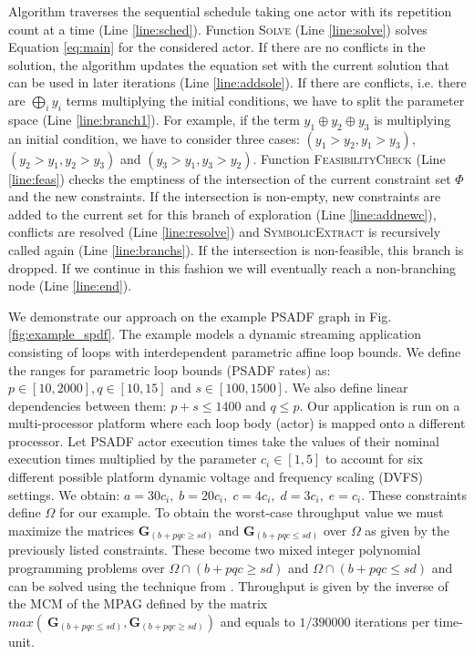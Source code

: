 \documentclass[]{eptcs}
\begin{document}
Algorithm traverses the sequential schedule taking one actor with its repetition count at a time (Line \ref{line:sched}). Function \textsc{Solve} (Line \ref{line:solve}) solves Equation \eqref{eq:main} for the considered actor. If there are no conflicts in the solution, the algorithm updates the equation set with the current solution that can be used in later iterations (Line \ref{line:addsole}). If there are conflicts, i.e. there are $\bigoplus \limits_{i} y_i$ terms multiplying the initial conditions, we have to split the parameter space (Line \ref{line:branch1}). For example, if the term $y_1\oplus y_2 \oplus y_3$ is multiplying an initial condition, we have to consider three cases: $(y_1 > y_2, y_1 > y_3)$, $(y_2 > y_1, y_2 > y_3)$ and $(y_3 > y_1, y_3 > y_2)$. Function \textsc{FeasibilityCheck} (Line \ref{line:feas}) checks the emptiness of the intersection of the current constraint set $\varPhi$ and the new constraints. If the intersection is non-empty, new constraints are added to the current set for this branch of exploration (Line \ref{line:addnewc}), conflicts are resolved (Line \ref{line:resolve}) and \textsc{SymbolicExtract} is recursively called again (Line \ref{line:branchs}). If the intersection is non-feasible, this branch is dropped. If we continue in this fashion we will eventually reach a non-branching node (Line \ref{line:end}).

We demonstrate our approach on the example PSADF graph in Fig. \ref{fig:example_spdf}. The example models a dynamic streaming application consisting of loops with interdependent parametric affine loop bounds. We define the ranges for parametric loop bounds (PSADF rates) as: $p \in \left[10, 2000\right], q \in \left[10, 15\right]$ and $s \in \left[100, 1500\right]$. We also define linear dependencies between them: $p+s \le 1400$ and $q \le p$. Our application is run on a multi-processor platform where each loop body (actor) is mapped onto a different processor. Let PSADF actor execution times take the values of their nominal execution times multiplied by the parameter $c_i \in \left[1, 5\right]$ to account for six different possible platform dynamic voltage and frequency scaling (DVFS) settings. We obtain: $a=30c_i,\; b= 20c_i,\; c=4c_i,\; d=3c_i,\; e=c_i$. These constraints define $\Omega$ for our example. To obtain the worst-case throughput value we must maximize the matrices $\mathbf{G}_{(b+pqc \geq sd)}$ and $\mathbf{G}_{(b+pqc \le sd)}$ over $\Omega$ as given by the previously listed constraints. These become two mixed integer polynomial programming problems over $\Omega \cap (b+pqc \geq sd)$ and $\Omega \cap (b+pqc \le sd)$ and can be solved using the technique from \cite{2sher:all}. Throughput is given by the inverse of the MCM of the MPAG defined by the matrix $\mathit{max}\left(\ \mathbf{G}_{(b+pqc \le sd)}, \mathbf{G}_{(b+pqc \geq sd)}\right)$ and equals to $1/390000$ iterations per time-unit.
\end{document}
